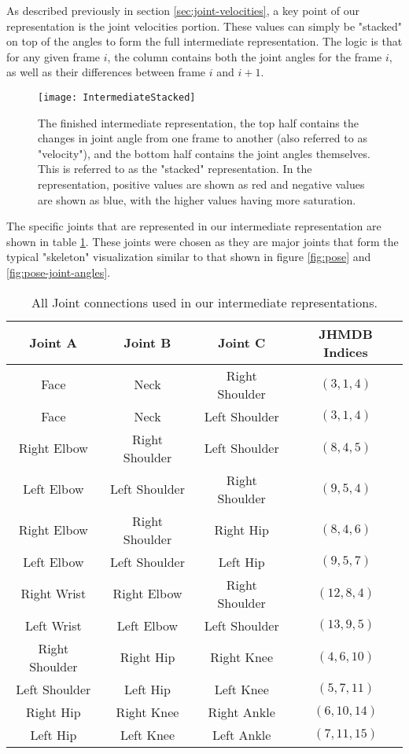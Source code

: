 As described previously in section \ref{sec:joint-velocities}, a key point of our representation is the joint velocities portion. These values can simply be "stacked" on top of the angles to form the full intermediate representation. The logic is that for any given frame $i$, the column contains both the joint angles for the frame $i$, as well as their differences between frame $i$ and $i+1$.

\begin{figure}[ht]
	\texttt{[image: IntermediateStacked]}
	\centering
	\caption{The finished intermediate representation, the top half contains the changes in joint angle from one frame to another (also referred to as "velocity"), and the bottom half contains the joint angles themselves. This is referred to as the "stacked" representation. In the representation, positive values are shown as red and negative values are shown as blue, with the higher values having more saturation.}
	\label{fig:intermediate-stacked}
\end{figure}

The specific joints that are represented in our intermediate representation are shown in table \ref{tab:joint-connections}. These joints were chosen as they are major joints that form the typical "skeleton" visualization similar to that shown in figure \ref{fig:pose} and \ref{fig:pose-joint-angles}.

\begin{table}[ht]
	\centering
	\begin{tabular}{||c c c c||} 
		\hline
		\textbf{Joint A} & \textbf{Joint B} & \textbf{Joint C} & \textbf{JHMDB Indices} \\ [0.5ex] 
		\hline\hline
		Face & Neck & Right Shoulder & $(3, 1, 4)$ \\
		Face & Neck & Left Shoulder & $(3, 1, 4)$ \\
		\hline
		Right Elbow & Right Shoulder & Left Shoulder & $(8, 4, 5)$ \\
		Left Elbow & Left Shoulder & Right Shoulder & $(9, 5, 4)$ \\
		\hline
		Right Elbow & Right Shoulder & Right Hip & $(8, 4, 6)$ \\
		Left Elbow & Left Shoulder & Left Hip & $(9, 5, 7)$ \\
		\hline
		Right Wrist & Right Elbow & Right Shoulder & $(12, 8, 4)$ \\
		Left Wrist & Left Elbow & Left Shoulder & $(13, 9, 5)$ \\
		\hline
		Right Shoulder & Right Hip & Right Knee & $(4, 6, 10)$ \\
		Left Shoulder & Left Hip & Left Knee & $(5, 7, 11)$ \\
		\hline
		Right Hip & Right Knee & Right Ankle & $(6, 10, 14)$ \\
		Left Hip & Left Knee & Left Ankle & $(7, 11, 15)$ \\
		\hline
	\end{tabular}
	\caption{All Joint connections used in our intermediate representations.}
	\label{tab:joint-connections}
\end{table}

